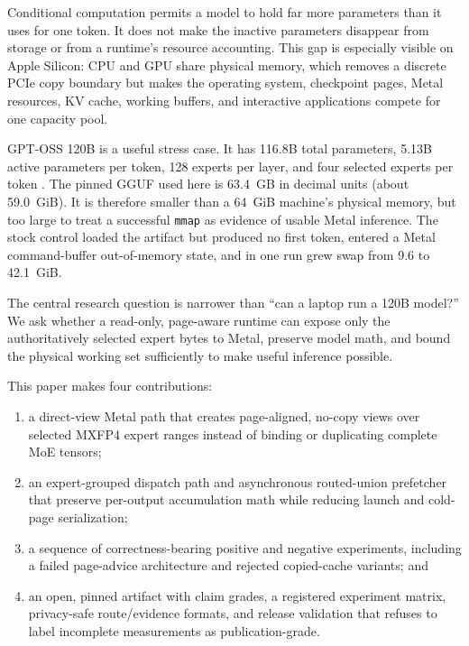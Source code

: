 \documentclass[10pt,twocolumn]{article}
\begin{document}
Conditional computation permits a model to hold far more parameters than it
uses for one token.  It does not make the inactive parameters disappear from
storage or from a runtime's resource accounting.  This gap is especially
visible on Apple Silicon: CPU and GPU share physical memory, which removes a
discrete PCIe copy boundary but makes the operating system, checkpoint pages,
Metal resources, KV cache, working buffers, and interactive applications
compete for one capacity pool.

GPT-OSS 120B is a useful stress case.  It has 116.8B total parameters, 5.13B
active parameters per token, 128 experts per layer, and four selected experts
per token \cite{openai2025gptoss}.  The pinned GGUF used here is 63.4~GB in
decimal units (about 59.0~GiB).  It is therefore smaller than a 64~GiB
machine's physical memory, but too large to treat a successful \texttt{mmap}
as evidence of usable Metal inference.  The stock control loaded the artifact
but produced no first token, entered a Metal command-buffer out-of-memory
state, and in one run grew swap from 9.6 to 42.1~GiB.

The central research question is narrower than ``can a laptop run a 120B
model?''  We ask whether a read-only, page-aware runtime can expose only the
authoritatively selected expert bytes to Metal, preserve model math, and bound
the physical working set sufficiently to make useful inference possible.

This paper makes four contributions:

\begin{enumerate}[leftmargin=*]
  \item a direct-view Metal path that creates page-aligned, no-copy views over
  selected MXFP4 expert ranges instead of binding or duplicating complete MoE
  tensors;
  \item an expert-grouped dispatch path and asynchronous routed-union
  prefetcher that preserve per-output accumulation math while reducing launch
  and cold-page serialization;
  \item a sequence of correctness-bearing positive and negative experiments,
  including a failed page-advice architecture and rejected copied-cache
  variants; and
  \item an open, pinned artifact with claim grades, a registered experiment
  matrix, privacy-safe route/evidence formats, and release validation that
  refuses to label incomplete measurements as publication-grade.
\end{enumerate}
\end{document}
